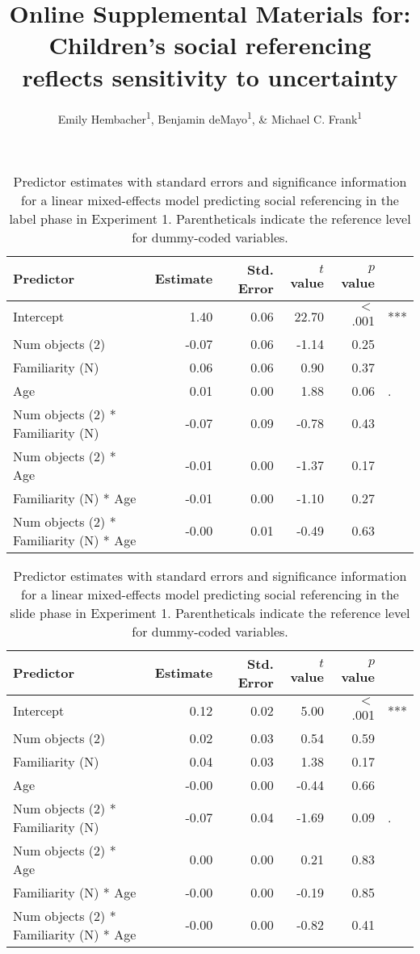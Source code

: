 \documentclass[english,man]{apa6}
\title{Online Supplemental Materials for: Children's social referencing
reflects sensitivity to uncertainty}
\author{Emily Hembacher\textsuperscript{1}, Benjamin deMayo\textsuperscript{1}, \& Michael C. Frank\textsuperscript{1}}
\affiliation{
    \vspace{0.5cm}
          \textsuperscript{1} Stanford University  }
\theoremstyle{definition}
\theoremstyle{definition}
\theoremstyle{definition}
\theoremstyle{remark}
\begin{document}
\maketitle

\setcounter{secnumdepth}{0}



\begin{table}[H]
\centering
\caption{Predictor estimates with standard errors and significance information for a linear mixed-effects model predicting social referencing in the label phase in Experiment 1. Parentheticals indicate the reference level for dummy-coded variables.} 
\label{tab:exp1_l_reg}
\begin{tabular}{lrrrrl}
 Predictor & Estimate & Std. Error & $t$ value & $p$ value &  \\ 
  \hline
Intercept & 1.40 & 0.06 & 22.70 & $<$ .001 & *** \\ 
  Num objects (2) & -0.07 & 0.06 & -1.14 & 0.25 &  \\ 
  Familiarity (N) & 0.06 & 0.06 & 0.90 & 0.37 &  \\ 
  Age & 0.01 & 0.00 & 1.88 & 0.06 & . \\ 
  Num objects (2) * Familiarity (N) & -0.07 & 0.09 & -0.78 & 0.43 &  \\ 
  Num objects (2) * Age & -0.01 & 0.00 & -1.37 & 0.17 &  \\ 
  Familiarity (N) * Age & -0.01 & 0.00 & -1.10 & 0.27 &  \\ 
  Num objects (2) * Familiarity (N) * Age & -0.00 & 0.01 & -0.49 & 0.63 &  \\ 
   \hline
\end{tabular}
\end{table}

\begin{table}[H]
\centering
\caption{Predictor estimates with standard errors and significance information for a linear mixed-effects model predicting social referencing in the slide phase in Experiment 1. Parentheticals indicate the reference level for dummy-coded variables.} 
\label{tab:exp1_l_reg}
\begin{tabular}{lrrrrl}
 Predictor & Estimate & Std. Error & $t$ value & $p$ value &  \\ 
  \hline
Intercept & 0.12 & 0.02 & 5.00 & $<$ .001 & *** \\ 
  Num objects (2) & 0.02 & 0.03 & 0.54 & 0.59 &  \\ 
  Familiarity (N) & 0.04 & 0.03 & 1.38 & 0.17 &  \\ 
  Age & -0.00 & 0.00 & -0.44 & 0.66 &  \\ 
  Num objects (2) * Familiarity (N) & -0.07 & 0.04 & -1.69 & 0.09 & . \\ 
  Num objects (2) * Age & 0.00 & 0.00 & 0.21 & 0.83 &  \\ 
  Familiarity (N) * Age & -0.00 & 0.00 & -0.19 & 0.85 &  \\ 
  Num objects (2) * Familiarity (N) * Age & -0.00 & 0.00 & -0.82 & 0.41 &  \\ 
   \hline
\end{tabular}
\end{table}
\end{document}
